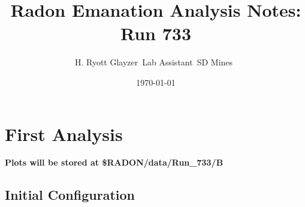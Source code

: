 \documentclass[letterpaper,12pt]{article}
\begin{document}
\title{Radon Emanation Analysis Notes: Run 733}
\author{
	H. Ryott Glayzer\
	Lab Assistant\
	SD Mines\
}
\date{\today}

\maketitle

\section*{First Analysis}
\textbf{Plots will be stored at \$RADON/data/Run\_733/B}
\subsection*{Initial Configuration}
\end{document}
